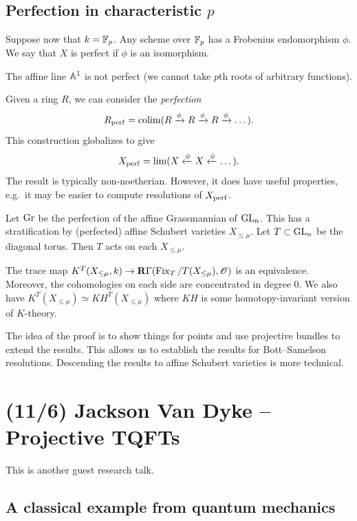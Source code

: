 \documentclass{article}
\begin{document}
\subsection{Perfection in characteristic $p$}

Suppose now that $k = \FF_p$.
Any scheme over $\FF_p$ has a Frobenius endomorphism $\phi$.
We say that $X$ is perfect if $\phi$ is an isomorphism.

\begin{ex}
  The affine line $\AA^1$ is not perfect (we cannot take $p$th roots of arbitrary functions).
\end{ex}

Given a ring $R$, we can consider the \emph{perfection}
\[
  R_\perf = \colim(R \xrightarrow{\phi} R \xrightarrow{\phi} R \xrightarrow{\phi} \dots).
\]
This construction globalizes to give
\[
  X_\perf = \lim(X \xleftarrow{\phi} X \xleftarrow{\phi} \dots).
\]
The result is typically non-noetherian.
However, it does have useful properties, e.g.\ it may be easier to compute resolutions of $X_\perf$.

Let $\Gr$ be the perfection of the affine Grassmannian of $\GL_n$.
This has a stratification by (perfected) affine Schubert varieties $X_{\leq \mu}$.
Let $T \subset \GL_n$ be the diagonal torus.
Then $T$ acts on each $X_{\leq \mu}$.

\begin{thm}[L]
  The trace map $K^T(X_{\leq \mu}, k) \to \Rbf \Gamma(\Fix_T/T(X_{\leq \mu}), \Osc)$ is an equivalence.
  Moreover, the cohomologies on each side are concentrated in degree $0$.
  We also have $K^T(X_{\leq \mu}) \simeq KH^T(X_{\leq \mu})$ where $KH$ is some homotopy-invariant version of $K$-theory.
\end{thm}

The idea of the proof is to show things for points and use projective bundles to extend the results.
This allows us to establish the results for Bott--Samelson resolutions.
Descending the results to affine Schubert varieties is more technical.

\section{(11/6) Jackson Van Dyke -- Projective TQFTs}

This is another guest research talk.

\subsection{A classical example from quantum mechanics}
\end{document}
